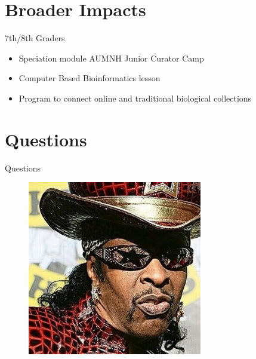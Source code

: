 \documentclass[t,10pt]{beamer}
\begin{document}
\section{Broader Impacts}
\label{sec:orgheadline44}
\begin{frame}[label={sec:orgheadline43}]{7th/8th Graders}
\begin{itemize}[<+->]
\item Speciation module AUMNH Junior Curator Camp
\item Computer Based Bioinformatics lesson
\item Program to connect online and traditional biological collections
\end{itemize}
\end{frame}
\section{Questions}
\label{sec:orgheadline46}
\begin{frame}[label={sec:orgheadline45}]{Questions}
\begin{figure}[htb]
\centering
\includegraphics[width=3in,height=3in]{./Figures/Bootsy.jpeg}
\end{figure}
\end{frame}
\end{document}
